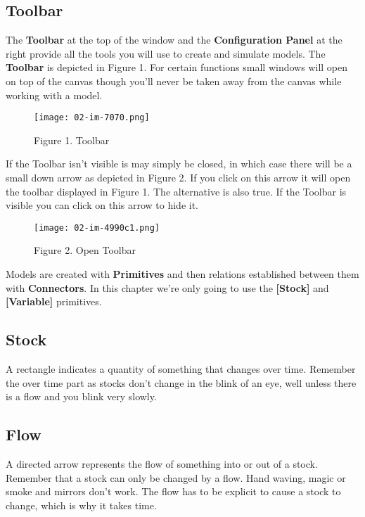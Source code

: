 \documentclass[]{memoir}
\let\Oldincludegraphics\includegraphics
\renewcommand{\includegraphics}[1]{\Oldincludegraphics[max size={\textwidth}{\textheight}]{#1}}
\newcommand{\p}[1]{\textbf{{[}#1{]}}}
\renewcommand{\u}[1]{\textbf{#1}}
\begin{document}
\subsection{Toolbar}

The \u{Toolbar} at the top of the window and the \u{Configuration Panel}
at the right provide all the tools you will use to create and simulate
models. The \u{Toolbar} is depicted in Figure 1. For certain functions
small windows will open on top of the canvas though you'll never be
taken away from the canvas while working with a model.

\begin{figure}[htbp]
\centering
\texttt{[image: 02-im-7070.png]}
\caption{Figure 1. Toolbar}
\end{figure}

If the Toolbar isn't visible is may simply be closed, in which case
there will be a small down arrow as depicted in Figure 2. If you click
on this arrow it will open the toolbar displayed in Figure 1. The
alternative is also true. If the Toolbar is visible you can click on
this arrow to hide it.

\begin{figure}[htbp]
\centering
\texttt{[image: 02-im-4990c1.png]}
\caption{Figure 2. Open Toolbar}
\end{figure}

Models are created with \u{Primitives} and then relations established
between them with \u{Connectors}. In this chapter we're only going to
use the \p{Stock} and \p{Variable} primitives.

\subsection{Stock}

A rectangle indicates a quantity of something that changes over time.
Remember the over time part as stocks don't change in the blink of an
eye, well unless there is a flow and you blink very slowly.

\subsection{Flow}

A directed arrow represents the flow of something into or out of a
stock. Remember that a stock can only be changed by a flow. Hand waving,
magic or smoke and mirrors don't work. The flow has to be explicit to
cause a stock to change, which is why it takes time.
\end{document}

